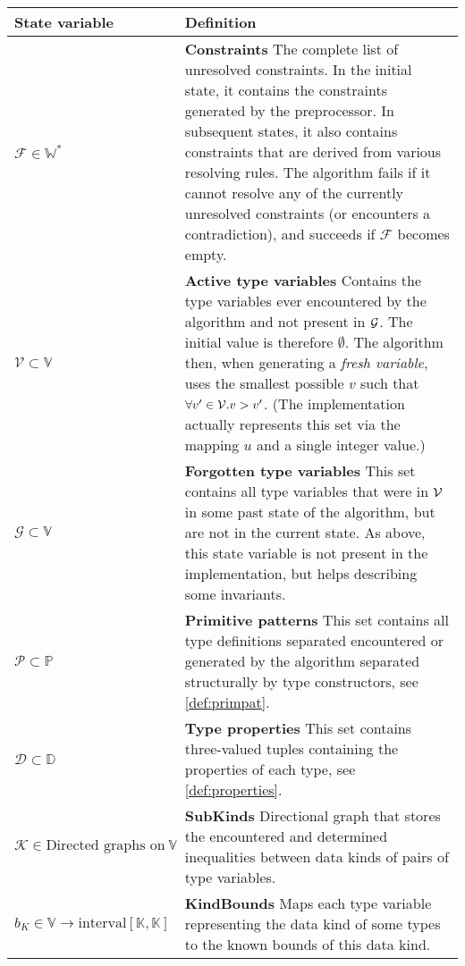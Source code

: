 \begin{table}
\scriptsize
\def\arraystretch{1.3}
\begin{tabular}{p{.23\linewidth}p{.7\linewidth}}
\toprule
State variable & Definition \\
\midrule
  $\mathcal{F} \in \mathbb{W}^\ast$ & \textbf{Constraints}\quad
  The complete list of unresolved constraints. In the initial state, it contains the constraints generated by the preprocessor. In subsequent states, it also contains constraints that are derived from various resolving rules. The algorithm fails if it cannot resolve any of the currently unresolved constraints (or encounters a contradiction), and succeeds if $\mathcal{F}$ becomes empty. \\

  $\mathcal{V} \subset \mathbb{V}$ & \textbf{Active type variables}\quad
  Contains the type variables ever encountered by the algorithm and not present in $\mathcal G$. The initial value is therefore $\emptyset$. The algorithm then, when generating a \emph{fresh variable}, uses the smallest possible $v$ such that $\forall v' \in \mathcal V. v > v'$. (The implementation actually represents this set via the mapping $u$ and a single integer value.) \\

  $\mathcal{G} \subset \mathbb{V}$ & \textbf{Forgotten type variables}\quad
  This set contains all type variables that were in $\mathcal V$ in some past state of the algorithm, but are not in the current state. As above, this state variable is not present in the implementation, but helps describing some invariants. \\

  $\mathcal{P} \subset \mathbb{P}$ & \textbf{Primitive patterns}\quad
  This set contains all type definitions separated encountered or generated by the algorithm separated structurally by type constructors, see \cref{def:primpat}. \\

  $\mathcal{D} \subset \mathbb{D}$ & \textbf{Type properties}\quad
  This set contains three-valued tuples containing the properties of each type, see \cref{def:properties}. \\

  $\mathcal{K} \in \text{Directed graphs on}\ \mathbb{V}$ & \textbf{SubKinds}\quad
  Directional graph that stores the encountered and determined inequalities between data kinds of pairs of type variables. \\

  $b_K \in \mathbb{V} \to \text{interval} \left[\mathbb{K}, \mathbb{K}\right]$ & \textbf{KindBounds}\quad
  Maps each type variable representing the data kind of some types to the known bounds of this data kind. \\


\end{tabular}
\end{table}
